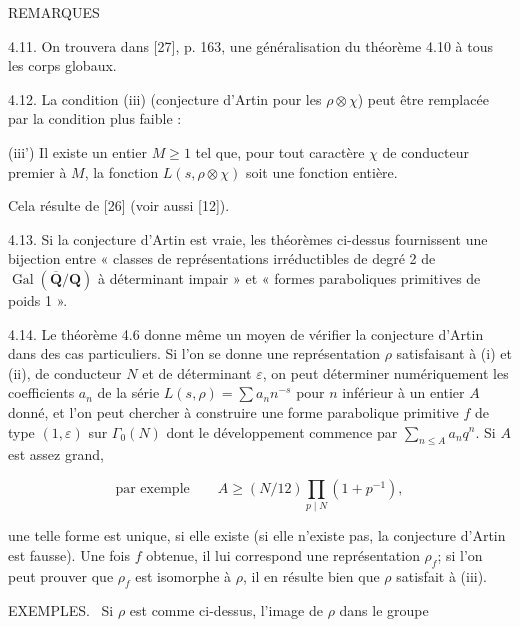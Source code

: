 \documentclass[10pt,oneside]{article}
\begin{document}
REMARQUES\par

4.11. On trouvera dans [27], p. 163, une généralisation du théorème 4.10 à tous les corps globaux.\par

4.12. La condition (iii) (conjecture d'Artin pour les \(\rho\otimes\chi\)) peut être remplacée par la condition plus faible :\par

(iii') Il existe un entier \(M\geq 1\) tel que, pour tout caractère \(\chi\) de conducteur premier à \(M\), la fonction \(L(s,\rho\otimes\chi)\) soit une fonction entière.\par

Cela résulte de [26] (voir aussi [12]).\par

4.13. Si la conjecture d'Artin est vraie, les théorèmes ci-dessus fournissent une bijection entre « classes de représentations irréductibles de degré 2 de \(\operatorname{Gal}(\overline{\mathbf{Q}}/\mathbf{Q})\) à déterminant impair » et « formes paraboliques primitives de poids 1 ».\par

4.14. Le théorème 4.6 donne même un moyen de vérifier la conjecture d'Artin dans des cas particuliers. Si l'on se donne une représentation \(\rho\) satisfaisant à (i) et (ii), de conducteur \(N\) et de déterminant \(\varepsilon\), on peut déterminer numériquement les coefficients \(a_n\) de la série \(L(s,\rho)=\sum a_nn^{-s}\) pour \(n\) inférieur à un entier \(A\) donné, et l'on peut chercher à construire une forme parabolique primitive \(f\) de type \((1,\varepsilon)\) sur \(\Gamma_0(N)\) dont le développement commence par \(\sum_{n\leq A}a_nq^n\). Si \(A\) est assez grand,\par

\begin{equation*}
\text{par exemple}\qquad
A\geq(N/12)\prod_{p\mid N}(1+p^{-1}),
\end{equation*}

une telle forme est unique, si elle existe (si elle n'existe pas, la conjecture d'Artin est fausse). Une fois \(f\) obtenue, il lui correspond une représentation \(\rho_f\); si l'on peut prouver que \(\rho_f\) est isomorphe à \(\rho\), il en résulte bien que \(\rho\) satisfait à (iii).\par

\noindent\textsc{EXEMPLES.} \textemdash\ Si \(\rho\) est comme ci-dessus, l'image de \(\rho\) dans le groupe\par
\end{document}
